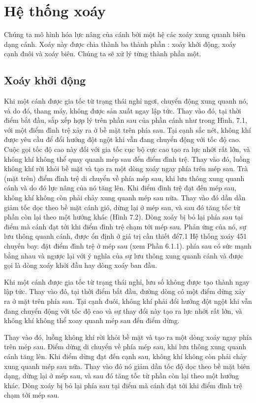 \documentclass[KHI_DONG_HOC.tex]{subfiles}
\begin{document}
\section{Hệ thống xoáy}

        Chúng ta mô hình hóa lực nâng của cánh bởi một hệ các xoáy xung quanh biên dạng cánh. Xoáy này được chia thành ba thành phần : xoáy khởi động, xoáy cạnh đuôi và xoáy biên. Chúng ta sẽ xử lý từng thành phần một.

\subsection{Xoáy khởi động}

        Khi một cánh được gia tốc từ trạng thái nghỉ ngơi, chuyển động xung quanh nó, và do đó, thang máy, không được sản xuất ngay lập tức. Thay vào đó, tại thời điểm bắt đầu, sắp xếp hợp lý trên phần sau của phần cánh như trong Hình. 7.1, với một điểm đình trệ xảy ra ở bề mặt trên phía sau. Tại cạnh sắc nét, không khí được yêu cầu để đổi hướng đột ngột khi vẫn đang chuyển động với tốc độ cao. Cuộc gọi tốc độ cao này đối với gia tốc cục bộ cực cao tạo ra lực nhớt rất lớn, và không khí không thể quay quanh mép sau đến điểm đình trệ. Thay vào đó, luồng không khí rời khỏi bề mặt và tạo ra một dòng xoáy ngay phía trên mép sau. Trà (mặt trên) điểm đình trệ di chuyển về phía mép sau, khi lưu thông xung quanh cánh và do đó lực nâng của nó tăng lên. Khi điểm đình trệ đạt đến mép sau, không khí không còn phải chảy xung quanh mép sau nữa. Thay vào đó dần dần giảm tốc dọc theo bề mặt cánh gió, dừng lại ở mép sau, và sau đó tăng tốc từ phần còn lại theo một hướng khác (Hình 7.2). Dòng xoáy bị bỏ lại phía sau tại điểm mà cánh đạt tới khi điểm đình trệ chạm tới mép sau. Phản ứng của nó, sự lưu thông quanh cánh, được ổn định ở giá trị cần thiết để7.1 Hệ thống xoáy 451 chuyến bay. đặt điểm đình trệ ở mép sau (xem Phần 6.1.1). phía sau có sức mạnh bằng nhau và ngược lại với ý nghĩa của sự lưu thông xung quanh cánh và được gọi là dòng xoáy khởi đầu hay dòng xoáy ban đầu.









Khi một cánh được gia tốc từ trạng thái nghỉ, lưu số không được tạo thành ngay lập tức. Thay vào đó, tại thời điểm bắt đầu, đường dòng có một điểm dừng xảy ra ở mặt trên phía sau. Tại cạnh đuôi, không khí phải đổi hướng đột ngột khi vẫn đang chuyển động với tốc độ cao và sự thay đổi này tạo ra lực nhớt rất lớn, và không khí không thể xoay quanh mép sau đến điểm dừng.

        Thay vào đó, luồng không khí rời khỏi bề mặt và tạo ra một dòng xoáy ngay phía trên mép sau. Điểm dừng di chuyển về phía mép sau, khi lưu thông xung quanh cánh tăng lên. Khi điểm dừng đạt đến cạnh sau, không khí không còn phải chảy xung quanh mép sau nữa. Thay vào đó nó giảm dần tốc độ dọc theo bề mặt biên dạng, dừng lại ở mép sau, và sau đó  tăng tốc từ phần còn lại theo một hướng khác. Dòng xoáy bị bỏ lại phía sau tại điểm mà cánh đạt tới khi điểm đình trệ chạm tới mép sau.
\end{document}
